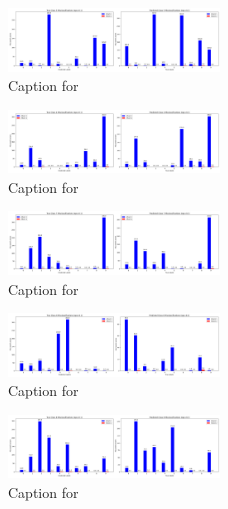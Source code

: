 \documentclass[12pt, a4paper]{article}
\begin{document}
\begin{figure}[ht]
\centering
\includegraphics[width=0.5\textwidth]{combined_class_boundary_pgd/combined_class_5_misclassifications_eps_0.1.png}
\caption{Caption for }
\label{fig:combined_class_5_misclassifications_eps_0.1.png}
\end{figure}

\begin{figure}[ht]
\centering
\includegraphics[width=0.5\textwidth]{combined_class_boundary_pgd/combined_class_4_misclassifications_eps_0.1.png}
\caption{Caption for }
\label{fig:combined_class_4_misclassifications_eps_0.1.png}
\end{figure}

\begin{figure}[ht]
\centering
\includegraphics[width=0.5\textwidth]{combined_class_boundary_pgd/combined_class_7_misclassifications_eps_0.1.png}
\caption{Caption for }
\label{fig:combined_class_7_misclassifications_eps_0.1.png}
\end{figure}

\begin{figure}[ht]
\centering
\includegraphics[width=0.5\textwidth]{combined_class_boundary_pgd/combined_class_6_misclassifications_eps_0.1.png}
\caption{Caption for }
\label{fig:combined_class_6_misclassifications_eps_0.1.png}
\end{figure}

\begin{figure}[ht]
\centering
\includegraphics[width=0.5\textwidth]{combined_class_boundary_pgd/combined_class_8_misclassifications_eps_0.1.png}
\caption{Caption for }
\label{fig:combined_class_8_misclassifications_eps_0.1.png}
\end{figure}
\end{document}
